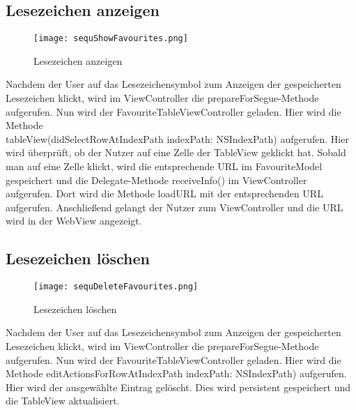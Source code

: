 \subsection{Lesezeichen anzeigen}
\begin{figure}[ht]
	\centering
	\texttt{[image: sequShowFavourites.png]}
	\caption{Lesezeichen anzeigen}
	\label{fig:Lesezeichen anzeigen}
\end{figure}
Nachdem der User auf das Lesezeichensymbol zum Anzeigen der gespeicherten Lesezeichen klickt, wird im ViewController die prepareForSegue-Methode aufgerufen. Nun wird der FavouriteTableViewController geladen. Hier wird die Methode\\tableView(didSelectRowAtIndexPath indexPath: NSIndexPath) aufgerufen. Hier wird überprüft, ob der Nutzer auf eine Zelle der TableView geklickt hat. Sobald man auf eine Zelle klickt, wird die entsprechende URL im FavouriteModel gespeichert und die Delegate-Methode receiveInfo() im ViewController aufgerufen. Dort wird die Methode loadURL mit der entsprechenden URL aufgerufen. Anschließend gelangt der Nutzer zum ViewController und die URL wird in der WebView angezeigt.
\pagebreak

\subsection{Lesezeichen löschen}
\begin{figure}[ht]
	\centering
	\texttt{[image: sequDeleteFavourites.png]}
	\caption{Lesezeichen löschen}
	\label{fig:Lesezeichen loeschen}
\end{figure}
Nachdem der User auf das Lesezeichensymbol zum Anzeigen der gespeicherten Lesezeichen klickt, wird im ViewController die prepareForSegue-Methode aufgerufen. Nun wird der FavouriteTableViewController geladen. Hier wird die Methode editActionsForRowAtIndexPath indexPath: NSIndexPath) aufgerufen. Hier wird der ausgewählte Eintrag gelöscht. Dies wird persistent gespeichert und die TableView aktualisiert.
\pagebreak
